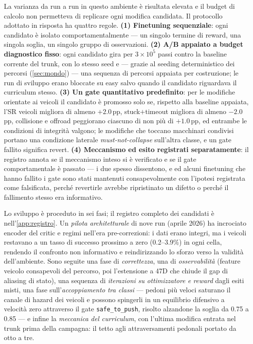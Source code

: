La varianza da run a run in questo ambiente è risultata elevata e il budget di
calcolo non permetteva di replicare ogni modifica candidata. Il
protocollo adottato in risposta ha quattro regole. \textbf{(1) Finetuning sequenziale}: 
ogni candidato è isolato comportamentalmente --- un singolo termine di reward, 
una singola soglia, un singolo gruppo di osservazioni. 
\textbf{(2) A/B appaiato a budget diagnostico fisso}: 
ogni candidato gira per $3\times10^{5}$ passi contro la baseline 
corrente del trunk, con lo stesso seed e --- grazie al
seeding deterministico dei percorsi (\cref{sec:mondo}) --- una sequenza
di percorsi appaiata per costruzione; le run di sviluppo erano bloccate
su easy salvo quando il candidato riguardava il curriculum stesso.
\textbf{(3) Un gate
quantitativo predefinito}: per le modifiche orientate ai veicoli il
candidato è promosso solo se, rispetto alla baseline appaiata, l'SR
veicoli migliora di almeno $+2.0$\,pp, stuck$+$timeout migliora di
almeno $-2.0$\,pp, collisione e offroad peggiorano ciascuno di non più
di $+1.0$\,pp, ed entrambe le condizioni di integrità valgono; le
modifiche che toccano macchinari condivisi portano una condizione
laterale \emph{must-not-collapse} sull'altra classe, e un gate fallito
significa revert. \textbf{(4) Meccanismo ed esito registrati
separatamente}: il registro annota se il meccanismo inteso si è
verificato e se il gate comportamentale è passato --- i due spesso
dissentono, e ed alcuni finetuning che hanno fallito i gate sono stati 
mantenuti consapevolmente con l'ipotesi registrata come falsificata,
perché revertirle avrebbe ripristinato un difetto o perché il
fallimento stesso era informativo.

Lo sviluppo è proceduto in sei fasi; il registro completo dei candidati
è nell'\cref{app:registro}. Un \emph{pilota architetturale} di nove run
(aprile 2026) ha incrociato encoder del critic e regimi nell'era
pre-correzioni: i dati erano integri, ma i veicoli restavano a un tasso
di successo prossimo a zero (0.2--3.9\%) in ogni cella, rendendo il
confronto non informativo e reindirizzando lo sforzo verso la validità
dell'ambiente. Sono seguite una fase di \emph{correttezza}, una di
\emph{osservabilità} (feature veicolo consapevoli del percorso, poi
l'estensione a 47D che chiude il gap di aliasing di stato), una
sequenza di \emph{iterazioni su ottimizzatore e reward} dagli esiti
misti, una fase sull'\emph{accoppiamento tra classi} --- pedoni più
veloci saturano il canale di hazard dei veicoli e possono spingerli in
un equilibrio difensivo a velocità zero attraverso il gate
\texttt{safe\_to\_push}, risolto alzandone la soglia da 0.75 a 0.85 ---
e infine la \emph{meccanica del curriculum}, con l'ultima modifica
entrata nel trunk prima della campagna: il tetto agli attraversamenti
pedonali portato da otto a tre.

